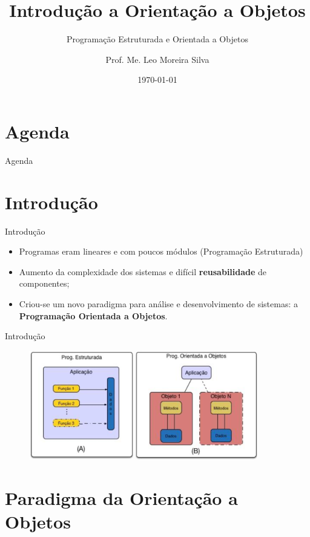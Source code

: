 \documentclass{beamer}
\title{Introdução a Orientação a Objetos}
\subtitle{Programação Estruturada e Orientada a Objetos}
\author{Prof. Me. Leo Moreira Silva}
\date{\today}
\begin{document}
{ 
\frame{\titlepage}}

\section*{Agenda}\begin{frame}{Agenda}\tableofcontents\end{frame}

\section{Introdução}

\begin{frame}{Introdução}
    \begin{itemize}
        \item Programas eram lineares e com poucos módulos (Programação Estruturada)
        \item Aumento da complexidade dos sistemas e difícil \textbf{reusabilidade} de componentes;
        \item Criou-se um novo paradigma para análise e desenvolvimento de sistemas: a \textbf{Programação Orientada a Objetos}.
    \end{itemize}
\end{frame}

\begin{frame}{Introdução}
    \begin{figure}
        \includegraphics[width=10cm]{Theme/Logos/progest_x_progobj.png}
    \end{figure}
\end{frame}

\section{Paradigma da Orientação a Objetos}
\end{document}

